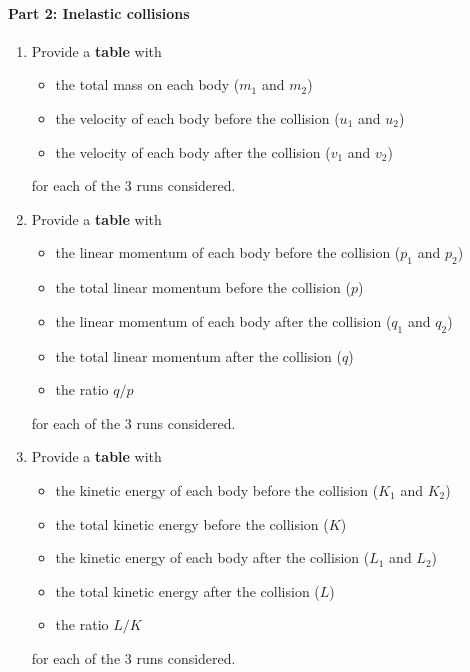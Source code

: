 \paragraph{Part 2: Inelastic collisions}
%
\begin{enumerate}
    \item Provide a \textbf{table} with
    \begin{itemize}
        \item the total mass on each body ($m_{1}$ and $m_{2}$)
        \item the velocity of each body before the collision ($u_{1}$ and $u_{2}$)
        \item the velocity of each body after the collision ($v_{1}$ and $v_{2}$)
    \end{itemize}
    for each of the 3 runs considered.
    \item Provide a \textbf{table} with
    \begin{itemize}
        \item the linear momentum of each body before the collision ($p_{1}$ and $p_{2}$)
        \item the total linear momentum before the collision ($p$)
        \item the linear momentum of each body after the collision ($q_{1}$ and $q_{2}$)
        \item the total linear momentum after the collision ($q$)
        \item the ratio $q/p$
    \end{itemize}
    for each of the 3 runs considered.
    \item Provide a \textbf{table} with
    \begin{itemize}
        \item the kinetic energy of each body before the collision ($K_{1}$ and $K_{2}$)
        \item the total kinetic energy before the collision ($K$)
        \item the kinetic energy of each body after the collision ($L_{1}$ and $L_{2}$)
        \item the total kinetic energy after the collision ($L$)
        \item the ratio $L/K$
    \end{itemize}
    for each of the 3 runs considered.
\end{enumerate}
%
